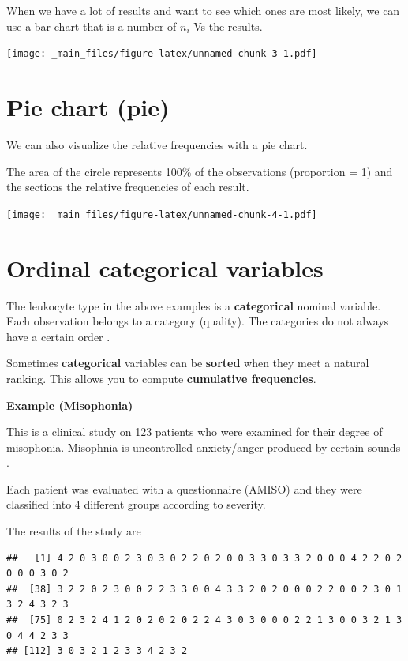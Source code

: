 \documentclass[
]{book}
\begin{document}
When we have a lot of results and want to see which ones are most likely, we can use a bar chart that is a number of \(n_i\) Vs the results.

\texttt{[image: \_main\_files/figure-latex/unnamed-chunk-3-1.pdf]}

\hypertarget{pie-chart-pie}{%
\section{Pie chart (pie)}\label{pie-chart-pie}}

We can also visualize the relative frequencies with a pie chart.

The area of the circle represents 100\% of the observations (proportion = 1) and the sections the relative frequencies of each result.

\texttt{[image: \_main\_files/figure-latex/unnamed-chunk-4-1.pdf]}

\hypertarget{ordinal-categorical-variables}{%
\section{Ordinal categorical variables}\label{ordinal-categorical-variables}}

The leukocyte type in the above examples is a \textbf{categorical} nominal variable. Each observation belongs to a category (quality). The categories do not always have a certain order .

Sometimes \textbf{categorical} variables can be \textbf{sorted} when they meet a natural ranking. This allows you to compute \textbf{cumulative frequencies}.

\newpage

\textbf{Example (Misophonia)}

This is a clinical study on 123 patients who were examined for their degree of misophonia. Misophnia is uncontrolled anxiety/anger produced by certain sounds .

Each patient was evaluated with a questionnaire (AMISO) and they were classified into 4 different groups according to severity.

The results of the study are

\begin{verbatim}
##   [1] 4 2 0 3 0 0 2 3 0 3 0 2 2 0 2 0 0 3 3 0 3 3 2 0 0 0 4 2 2 0 2 0 0 0 3 0 2
##  [38] 3 2 2 0 2 3 0 0 2 2 3 3 0 0 4 3 3 2 0 2 0 0 0 2 2 0 0 2 3 0 1 3 2 4 3 2 3
##  [75] 0 2 3 2 4 1 2 0 2 0 2 0 2 2 4 3 0 3 0 0 0 2 2 1 3 0 0 3 2 1 3 0 4 4 2 3 3
## [112] 3 0 3 2 1 2 3 3 4 2 3 2
\end{verbatim}
\end{document}
